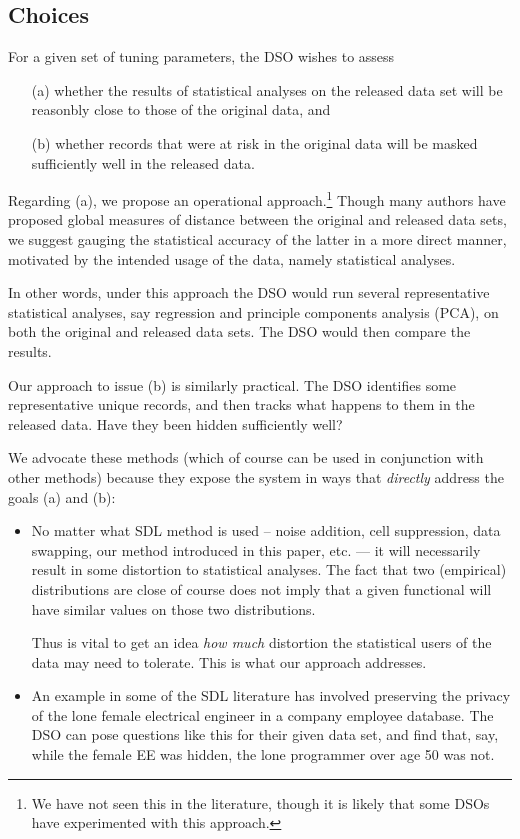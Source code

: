 \documentclass[11pt]{article}
\begin{document}
\subsection{Choices}

For a given set of tuning parameters, the DSO wishes to assess

\begin{itemize}

\item [(a)] whether the results of statistical  analyses on the released
data set will be reasonbly close to those of the original data, and 

\item [(b)]
whether records that were at risk in the original data will be masked 
sufficiently well in the released data.

\end{itemize}

Regarding (a), we propose an operational approach.\footnote{We have not
seen this in the literature, though it is likely that some DSOs have
experimented with this approach.}  Though many authors have proposed
global measures of distance between the original and released data sets,
we suggest gauging the statistical accuracy of the latter in a more
direct manner, motivated by the intended usage of the data, namely
statistical analyses.

In other words, under this approach the DSO would run several
representative statistical analyses, say regression and principle
components analysis (PCA), on both the original and released data sets.
The DSO would then compare the results. 

Our approach to issue (b) is similarly practical.  The DSO identifies
some representative unique records, and then tracks what happens to
them in the released data.  Have they been hidden sufficiently well?

We advocate these methods (which of course can be used in conjunction
with other methods) because they expose the system in ways that {\it
directly} address the goals (a) and (b):

\begin{itemize}

\item No matter what SDL method is used -- noise addition, cell
suppression, data swapping, our method introduced in this paper, etc.
--- it will necessarily result in some distortion to statistical analyses.
The fact that two (empirical) distributions are close  of course does
not imply that a given functional will have similar values on those two
distributions.

Thus is vital to get an idea {\it how much} distortion the statistical
users of the data may need to tolerate.  This is what our approach
addresses.

\item An example in some of the SDL literature has involved preserving
the privacy of the lone female electrical engineer in a company
employee database.  The DSO can pose questions like this for their given
data set, and find that, say,  while the female EE was hidden, the lone
programmer over age 50 was not.

\end{itemize}
\end{document}
